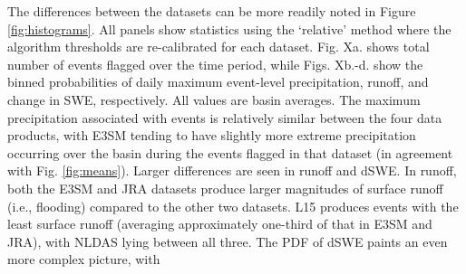 \documentclass[draft]{agujournal2019}
\begin{document}
\begin{table}
\caption{....}
\label{table:means}
\end{table}

The differences between the datasets can be more readily noted in Figure \ref{fig:histograms}. All panels show statistics using the `relative' method where the algorithm thresholds are re-calibrated for each dataset. Fig. Xa. shows total number of events flagged over the time period, while Figs. Xb.-d. show the binned probabilities of daily maximum event-level precipitation, runoff, and change in SWE, respectively. All values are basin averages. The maximum precipitation associated with events is relatively similar between the four data products, with E3SM tending to have slightly more extreme precipitation occurring over the basin during the events flagged in that dataset (in agreement with Fig. \ref{fig:means}). Larger differences are seen in runoff and dSWE. In runoff, both the E3SM and JRA datasets produce larger magnitudes of surface runoff (i.e., flooding) compared to the other two datasets. L15 produces events with the least surface runoff (averaging approximately one-third of that in E3SM and JRA), with NLDAS lying between all three. The PDF of dSWE paints an even more complex picture, with 
\end{document}
